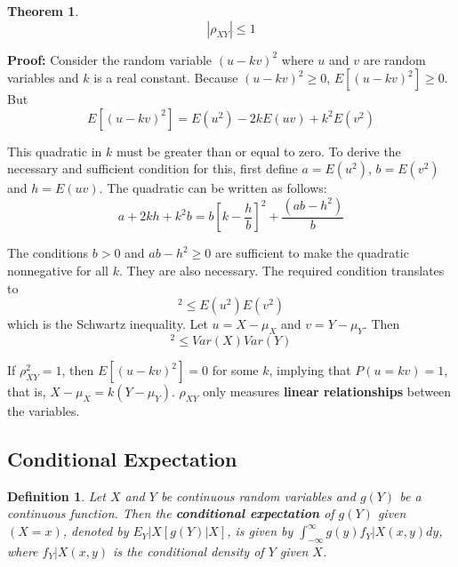 \documentclass{article}
\newtheorem{definition}{Definition}[section]
\newtheorem{theorem}{Theorem}[section]
\begin{document}
\begin{theorem}
    \begin{equation}
        |\rho_{XY}| \leq 1
    \end{equation}
\end{theorem}

\textbf{Proof:} Consider the random variable \((u-kv)^2\) where \(u\) and \(v\) are random variables and \(k\) is a real constant. Because \((u-kv)^2 \geq 0\), \(E[(u-kv)^2] \geq 0\). But
\begin{equation*}
    E[(u-kv)^2]=E(u^2)-2kE(uv)+k^2 E(v^2)
\end{equation*}

This quadratic in \(k\) must be greater than or equal to zero. To derive the necessary and sufficient condition for this, first define \(a=E(u^2)\), \(b=E(v^2)\) and \(h=E(uv)\). The quadratic can be written as follows:
\begin{equation*}
   a+2kh+k^2b = b \left[k-\frac{h}{b} \right]^2 + \frac{(ab-h^2)}{b}
\end{equation*}

The conditions \(b>0\) and \(ab-h^2 \geq 0\) are sufficient to make the quadratic nonnegative for all \(k\). They are also necessary. The required condition translates to
\begin{equation*}
    [E(uv)]^2 \leq E(u^2) E(v^2)
\end{equation*}
which is the Schwartz inequality. Let \(u=X-\mu_X\) and \(v=Y-\mu_Y\). Then
\begin{equation*}
    [Cov(X,Y)]^2 \leq Var(X)Var(Y)
\end{equation*}

If \(\rho_{XY}^2=1\), then \(E[(u-kv)^2]=0\) for some \(k\), implying that \(P(u=kv)=1\), that is, \(X-\mu_X=k(Y-\mu_Y)\). \(\rho_{XY}\) only measures \textbf{linear relationships} between the variables.

\subsection{Conditional Expectation}

\begin{definition}
    Let \(X\) and \(Y\) be continuous random variables and \(g(Y)\) be a continuous function. Then the \textbf{conditional expectation} of \(g(Y)\) given \((X=x)\), denoted by \(E_Y|X [g(Y)|X]\), is given by \(\int_{-\infty}^{\infty}g(y)f_Y|X(x,y)dy\), where \(f_Y|X(x,y)\) is the conditional density of \(Y\) given \(X\).
\end{definition}
\end{document}

